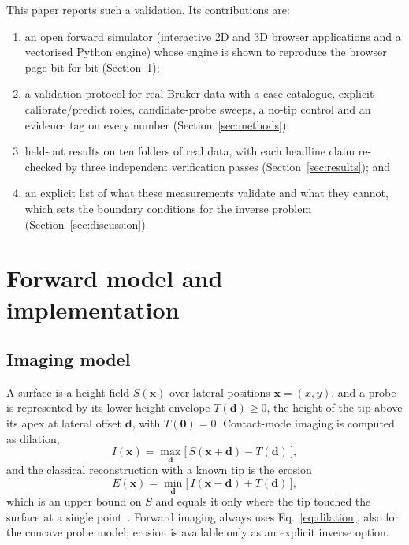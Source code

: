 \documentclass[preprint,12pt]{elsarticle}
\begin{document}
This paper reports such a validation. Its contributions are:
\begin{enumerate}
  \item an open forward simulator (interactive 2D and 3D browser applications and a vectorised
        Python engine) whose engine is shown to reproduce the browser page bit for bit
        (Section~\ref{sec:model});
  \item a validation protocol for real Bruker data with a case catalogue, explicit
        calibrate/predict roles, candidate-probe sweeps, a no-tip control and an evidence tag on
        every number (Section~\ref{sec:methods});
  \item held-out results on ten folders of real data, with each headline claim re-checked by
        three independent verification passes (Section~\ref{sec:results}); and
  \item an explicit list of what these measurements validate and what they cannot, which sets
        the boundary conditions for the inverse problem (Section~\ref{sec:discussion}).
\end{enumerate}

\section{Forward model and implementation}
\label{sec:model}

\subsection{Imaging model}

A surface is a height field $S(\mathbf{x})$ over lateral positions $\mathbf{x}=(x,y)$, and a probe
is represented by its lower height envelope $T(\mathbf{d})\ge 0$, the height of the tip above its
apex at lateral offset $\mathbf{d}$, with $T(\mathbf{0})=0$. Contact-mode imaging is computed as
dilation,
\begin{equation}
  I(\mathbf{x}) = \max_{\mathbf{d}} \bigl[\, S(\mathbf{x}+\mathbf{d}) - T(\mathbf{d}) \,\bigr],
  \label{eq:dilation}
\end{equation}
and the classical reconstruction with a known tip is the erosion
\begin{equation}
  E(\mathbf{x}) = \min_{\mathbf{d}} \bigl[\, I(\mathbf{x}-\mathbf{d}) + T(\mathbf{d}) \,\bigr],
  \label{eq:erosion}
\end{equation}
which is an upper bound on $S$ and equals it only where the tip touched the surface at a single
point~\cite{villarrubia1997}. Forward imaging always uses Eq.~\eqref{eq:dilation}, also for the
concave probe model; erosion is available only as an explicit inverse option.
\end{document}
